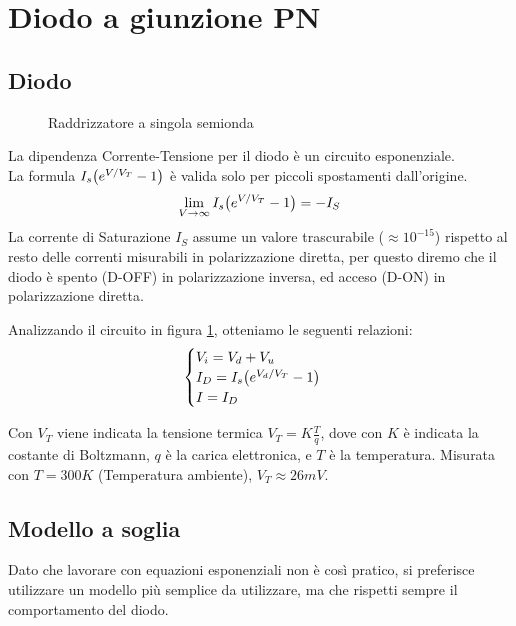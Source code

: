 \documentclass[../elettronica]{subfiles}
\begin{document}
\section{Diodo a giunzione PN}
\subsection{Diodo}
\begin{figure}[h]
    \centering
    \caption{Raddrizzatore a singola semionda}
    \label{circuit:singola_semionda}
\end{figure}

La dipendenza Corrente-Tensione per il diodo è un circuito esponenziale.
\\
La formula $I_s \big(e^{V/V_T} -1\big)$ è valida solo per piccoli spostamenti dall'origine.
\[
    \lim_{V\to\infty} I_s \big(e^{V/V_T} -1\big) = -I_S
\]
La corrente di Saturazione $I_S$ assume un valore trascurabile ($\approx 10^{-15}$) rispetto al resto delle correnti misurabili in polarizzazione diretta, per questo diremo che il diodo è spento (D-OFF) in polarizzazione inversa, ed acceso (D-ON) in polarizzazione diretta.

Analizzando il circuito in figura \ref{circuit:singola_semionda}, otteniamo le seguenti relazioni:
\[
    \begin{cases}
        V_i = V_d + V_u
        \\
        I_D = I_s \big(e^{V_d/V_T} -1\big)
        \\
        I = I_D
    \end{cases}
\]

Con $V_T$ viene indicata la tensione termica $V_T = K \frac{T}{q}$, dove con $K$ è indicata la costante di Boltzmann, $q$ è la carica elettronica, e $T$ è la temperatura. Misurata con $T = 300K$ (Temperatura ambiente), $V_T \approx 26mV$.

\subsection{Modello a soglia}
Dato che lavorare con equazioni esponenziali non è così pratico, si preferisce utilizzare un modello più semplice da utilizzare, ma che rispetti sempre il comportamento del diodo.
\end{document}
